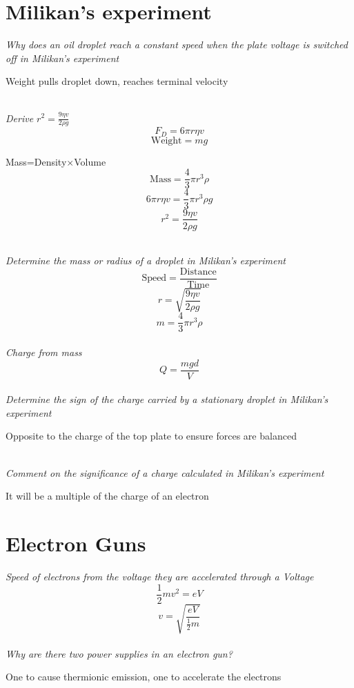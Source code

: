 \documentclass[12pt]{article}
\begin{document}
\section{Milikan's experiment}
\textit{Why does an oil droplet reach a constant speed when the plate voltage is switched off in Milikan's experiment}
\begin{center}
Weight pulls droplet down, reaches terminal velocity
\end{center}
$ $\\
\textit{Derive $r^2=\frac{9\eta v}{2\rho g}$}
$$F_D=6\pi r\eta v$$
$$\textrm{Weight}=mg$$
\begin{center}
Mass=Density$\times$Volume
$$\textrm{Mass}=\frac{4}{3}\pi r^3\rho$$
$$6\pi r\eta v=\frac{4}{3}\pi r^3\rho g$$
$$r^2=\frac{9\eta v}{2\rho g}$$
\end{center}
$ $\\
\textit{Determine the mass or radius of a droplet in Milikan's experiment}\\
$$\textrm{Speed}=\frac{\textrm{Distance}}{\textrm{Time}}$$
$$r=\sqrt{\frac{9\eta v}{2\rho g}}$$
$$m=\frac{4}{3}\pi r^3\rho$$
$ $\\
\textit{Charge from mass}
$$Q=\frac{mgd}{V}$$
$ $\\
\textit{Determine the sign of the charge carried by a stationary droplet in Milikan's experiment}
\begin{center}
Opposite to the charge of the top plate to ensure forces are balanced
\end{center}
$ $\\
\textit{Comment on the significance of a charge calculated in Milikan's experiment}
\begin{center}
It will be a multiple of the charge of an electron
\end{center}
\section{Electron Guns}
\textit{Speed of electrons from the voltage they are accelerated through a Voltage}\\
$$\frac{1}{2}mv^2=eV$$
$$v=\sqrt{\frac{eV}{\frac{1}{2}m}}$$
$ $\\
\textit{Why are there two power supplies in an electron gun?}
\begin{center}
One to cause thermionic emission, one to accelerate the electrons
\end{center}
\end{document}

